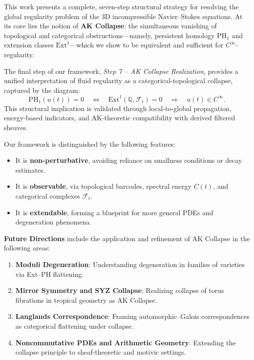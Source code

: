 \documentclass[11pt]{article}
\theoremstyle{definition}
\begin{document}
This work presents a complete, seven-step structural strategy for resolving the global regularity problem of the 3D incompressible Navier–Stokes equations.  
At its core lies the notion of \textbf{AK Collapse}: the simultaneous vanishing of topological and categorical obstructions—namely, persistent homology $\mathrm{PH}_1$ and extension classes $\mathrm{Ext}^1$—which we show to be equivalent and sufficient for $C^\infty$-regularity.

\medskip

\noindent
The final step of our framework, \emph{Step 7 – AK Collapse Realization}, provides a unified interpretation of fluid regularity as a categorical-topological collapse, captured by the diagram:
\[
\mathrm{PH}_1(u(t)) = 0 \quad \Longleftrightarrow \quad \mathrm{Ext}^1(\mathbb{Q}, \mathcal{F}_t) = 0 \quad \Longrightarrow \quad u(t) \in C^\infty.
\]
This structural implication is validated through local-to-global propagation, energy-based indicators, and AK-theoretic compatibility with derived filtered sheaves.

\medskip

\noindent
Our framework is distinguished by the following features:
\begin{itemize}
    \item It is \textbf{non-perturbative}, avoiding reliance on smallness conditions or decay estimates.
    \item It is \textbf{observable}, via topological barcodes, spectral energy $C(t)$, and categorical complexes $\mathcal{F}_t$.
    \item It is \textbf{extendable}, forming a blueprint for more general PDEs and degeneration phenomena.
\end{itemize}

\medskip

\noindent
\textbf{Future Directions} include the application and refinement of AK Collapse in the following areas:
\begin{enumerate}
    \item \textbf{Moduli Degeneration}: Understanding degeneration in families of varieties via Ext–PH flattening.
    \item \textbf{Mirror Symmetry and SYZ Collapse}: Realizing collapse of torus fibrations in tropical geometry as AK Collapse.
    \item \textbf{Langlands Correspondence}: Framing automorphic–Galois correspondences as categorical flattening under collapse.
    \item \textbf{Noncommutative PDEs and Arithmetic Geometry}: Extending the collapse principle to sheaf-theoretic and motivic settings.
\end{enumerate}
\end{document}

